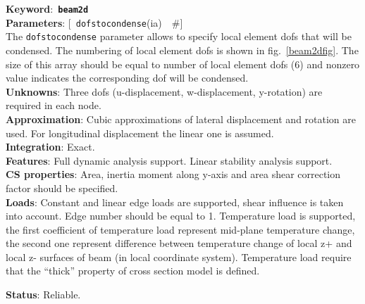 \documentclass[a4paper]{article}
\newcommand{\descitem}[1]{{\noindent \bf #1}:}
\newcommand{\elemkeyword}[1]{\descitem{Keyword}~{\bf \texttt{#1}}}
\newcommand{\elemparam}[2]{{{\texttt{#1}\tiny (#2)}~~\#}}
\newcommand{\optelemparam}[2]{{[~\elemparam{#1}{#2}]}}
\newcommand{\param}[1]{{\texttt{#1}}}
\begin{document}
\elemkeyword{beam2d}\\
\descitem{Parameters} \optelemparam{dofstocondense}{ia}\\
The \param{dofstocondense} parameter allows to specify local element dofs that
will be condensed. The numbering of local element dofs is shown in
fig.~\ref{beam2dfig}. The size of this array should be equal to
number of local element dofs (6) and nonzero value indicates the
corresponding dof will be condensed.\\
\descitem{Unknowns}
Three dofs (u-displacement, w-displacement, y-rotation) are required
in each node.\\
\descitem{Approximation} Cubic  approximations of lateral displacement and
rotation are used. For longitudinal displacement the linear one is
assumed.\\
\descitem{Integration} Exact.\\
\descitem{Features} Full dynamic analysis support. Linear stability
analysis support.\\
\descitem{CS properties} Area,
inertia moment along y-axis and area shear correction factor should be specified.\\ 
\descitem{Loads}  Constant and linear edge loads are supported, shear
influence is taken into account. 
Edge number should be equal to 1. Temperature load is
supported, the first coefficient of temperature load represent
mid-plane temperature change, the second one represent difference
between temperature change of local z+ and local z- surfaces of beam (in local coordinate
system). Temperature load require that the ``thick'' property of cross
section model is defined.

\descitem{Status} Reliable.
\end{document}
